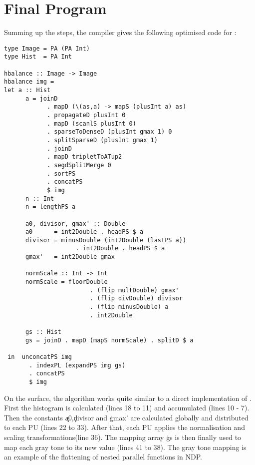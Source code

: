 \section{Final Program}
  Summing up the steps, the compiler gives the following optimised code for \ndpv:
  \begin{lstlisting}
type Image = PA (PA Int)
type Hist  = PA Int

hbalance :: Image -> Image
hbalance img =
let a :: Hist
      a = joinD
            . mapD (\(as,a) -> mapS (plusInt a) as)
            . propagateD plusInt 0
            . mapD (scanlS plusInt 0)
            . sparseToDenseD (plusInt gmax 1) 0
            . splitSparseD (plusInt gmax 1)
            . joinD
            . mapD tripletToATup2
            . segdSplitMerge 0
            . sortPS
            . concatPS
            $ img
      n :: Int
      n = lengthPS a
      
      a0, divisor, gmax' :: Double
      a0      = int2Double . headPS $ a
      divisor = minusDouble (int2Double (lastPS a))
                    . int2Double . headPS $ a
      gmax'   = int2Double gmax
      
      normScale :: Int -> Int
      normScale = floorDouble
                        . (flip multDouble) gmax'
                        . (flip divDouble) divisor
                        . (flip minusDouble) a
                        . int2Double
        
      gs :: Hist
      gs = joinD . mapD (mapS normScale) . splitD $ a
      
 in  unconcatPS img
       . indexPL (expandPS img gs)
       . concatPS
       $ img
  \end{lstlisting} %
  On the surface, the algorithm works quite similar to a direct implementation of \ndpn.
  First the histogram is calculated (lines 18 to 11) and accumulated (lines 10 - 7).
  Then the constants \c{a0},\c{divisor} and \c{gmax'} are calculated globally and distributed
  to each PU (lines 22 to 33). After that, each PU applies the normalisation and scaling transformations(line 36).
  The mapping array \c{gs} is then finally used to map each gray tone to its new value (lines 41 to 38).
  The gray tone mapping is an example of the flattening of nested parallel functions in NDP.
  
